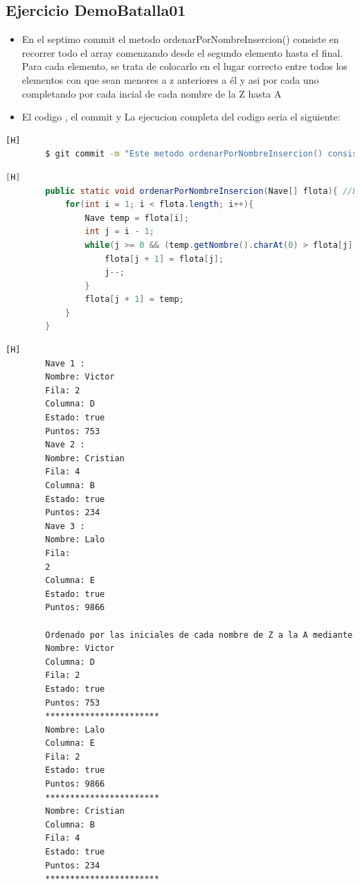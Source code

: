 \documentclass{article}
\begin{document}
    \subsection{Ejercicio DemoBatalla01}
	\begin{itemize}	
		\item En el septimo commit el metodo ordenarPorNombreInsercion() consiste en recorrer todo el array comenzando desde el segundo elemento hasta el final. Para cada elemento, se trata de colocarlo en el lugar correcto entre todos los elementos con que sean menores a z anteriores a él y asi por cada uno completando por cada incial de cada nombre de la Z hasta A
		\item El codigo , el commit y La ejecucion completa del codigo seria el siguiente:
	\end{itemize}
	\begin{lstlisting}[language=bash,caption={Commit}][H]
		$ git commit -m "Este metodo ordenarPorNombreInsercion() consiste en recorrer todo el array comenzando desde el segundo elemento hasta el final. Para cada elemento, se trata de colocarlo en el lugar correcto entre todos los elementos con que sean menores a z anteriores a el y asi por cada uno completando por cada incial de cada nombre de la Z hasta A"
	\end{lstlisting}
	\begin{lstlisting}[language=java,caption={Las lineas de codigo del metodo creado:}][H]
		public static void ordenarPorNombreInsercion(Nave[] flota){ //Este metodo ordenarPorNombreInsercion() consiste en recorrer todo el array comenzando desde el segundo elemento hasta el final. Para cada elemento, se trata de colocarlo en el lugar correcto entre todos los elementos con que sean menores a z anteriores a el y asi por cada uno completando por cada incial de cada nombre de la Z hasta A
			for(int i = 1; i < flota.length; i++){
				Nave temp = flota[i];
				int j = i - 1;
				while(j >= 0 && (temp.getNombre().charAt(0) > flota[j].getNombre().charAt(0))){
					flota[j + 1] = flota[j];
					j--;
				}
				flota[j + 1] = temp;
			}  
		}
	\end{lstlisting}
    \begin{lstlisting}[language=bash,caption={La ejecucion del codigo completo:}][H]
		Nave 1 : 
		Nombre: Victor
		Fila: 2
		Columna: D
		Estado: true
		Puntos: 753
		Nave 2 : 
		Nombre: Cristian
		Fila: 4
		Columna: B
		Estado: true
		Puntos: 234
		Nave 3 : 
		Nombre: Lalo
		Fila: 
		2
		Columna: E
		Estado: true
		Puntos: 9866
        
		Ordenado por las iniciales de cada nombre de Z a la A mediante el metodo insercion: 
		Nombre: Victor
		Columna: D
		Fila: 2
		Estado: true
		Puntos: 753
		***********************
		Nombre: Lalo
		Columna: E
		Fila: 2
		Estado: true
		Puntos: 9866
		***********************
		Nombre: Cristian
		Columna: B
		Fila: 4
		Estado: true
		Puntos: 234
		***********************

    \end{lstlisting}
\end{document}

